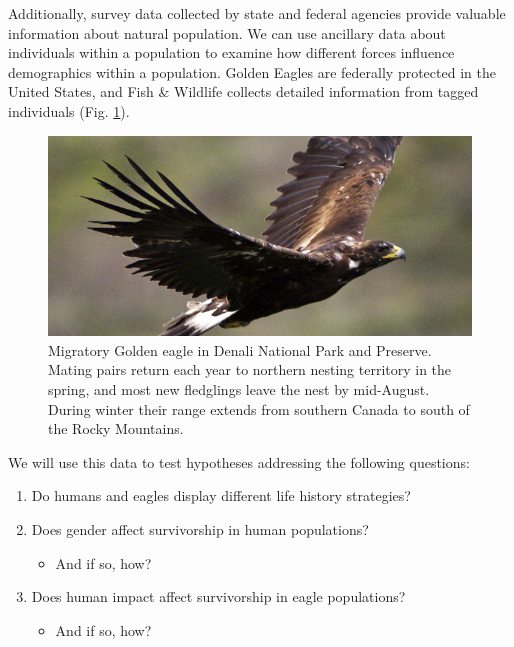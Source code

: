 \documentclass[]{krantz}
\providecommand{\tightlist}{%
  \setlength{\itemsep}{0pt}\setlength{\parskip}{0pt}}
\theoremstyle{definition}
\theoremstyle{definition}
\theoremstyle{definition}
\theoremstyle{remark}
\begin{document}
Additionally, survey data collected by state and federal agencies
provide valuable information about natural population. We can use
ancillary data about individuals within a population to examine how
different forces influence demographics within a population. Golden
Eagles are federally protected in the United States, and Fish \&
Wildlife collects detailed information from tagged individuals (Fig.
\ref{fig:eagle-fig}).

\begin{figure}
\centering
\includegraphics{chapter_materials/population_ecology/golden_eagle.jpg}
\caption{\label{fig:eagle-fig}Migratory Golden eagle in Denali National Park
and Preserve. Mating pairs return each year to northern nesting
territory in the spring, and most new fledglings leave the nest by
mid-August. During winter their range extends from southern Canada to
south of the Rocky Mountains\citep{brown_patterns_2017}.}
\end{figure}

We will use this data to test hypotheses addressing the following
questions:

\begin{enumerate}
\def\labelenumi{\arabic{enumi}.}
\tightlist
\item
  Do humans and eagles display different life history strategies?
\item
  Does gender affect survivorship in human populations?

  \begin{itemize}
  \tightlist
  \item
    And if so, how?
  \end{itemize}
\item
  Does human impact affect survivorship in eagle populations?

  \begin{itemize}
  \tightlist
  \item
    And if so, how?
  \end{itemize}
\end{enumerate}
\end{document}
